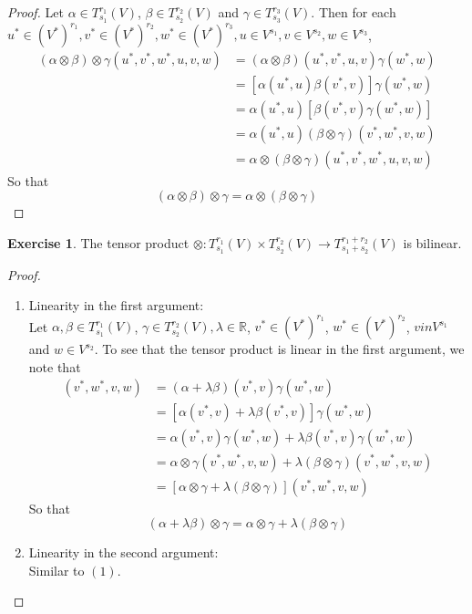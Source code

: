 \documentclass{book}
\theoremstyle{definition}
\newtheorem{ex}[definition]{Exercise}
\newcommand{\al}{\alpha}
\newcommand{\be}{\beta}
\newcommand{\gam}{\gamma}
\newcommand{\lam}{\lambda}
\newcommand{\R}{\mathbb{R}}
\DeclareMathOperator*{\0}{\mbf{0}}
\DeclareMathOperator*{\1}{\mbf{1}}
\newcommand{\Tn}[1]{T^{r_{#1}}_{s_{#1}}(V)}
\newcommand{\Tnp}{T^{r_1 + r_2}_{s_1 + s_2}(V)}
\begin{document}
	\begin{proof}
	Let $\al \in \Tn{1}$, $\be \in \Tn{2}$ and $\gam \in \Tn{3}$. Then for each $u^* \in (V^*)^{r_1}, v^* \in (V^*)^{r_2}, w^* \in (V^*)^{r_3}, u \in V^{s_1}, v \in V^{s_2}, w \in V^{s_3}$,  
	\begin{align*}
	(\al \otimes \be) \otimes \gam (u^*, v^*, w^*, u, v, w) 
	&= (\al \otimes \be) (u^*, v^*, u, v) \gam (w^*, w) \\
	&= [\al(u^*, u) \be(v^*, v)] \gam(w^*, w) \\
	&= \al(u^*, u) [\be(v^*, v) \gam(w^*, w)] \\
	&= \al(u^*, u) (\be \otimes \gam) (v^*, w^*, v, w) \\
	&= \al \otimes (\be \otimes \gam)(u^*, v^*, w^*, u, v, w) 
	\end{align*}
	So that $$(\al \otimes \be) \otimes \gam = \al \otimes (\be \otimes \gam)$$
\end{proof}		
	
	\begin{ex}
	The tensor product $\otimes : \Tn{1} \times  \Tn{2} \rightarrow \Tnp$ is bilinear. 
	\end{ex}
	
	\begin{proof}\
	\begin{enumerate}
	\item Linearity in the first argument:\\
	Let $\al, \be \in \Tn{1}$, $ \gam \in \Tn{2}, \lam \in \R$, $v^* \in (V^*)^{r_1}$, $w^* \in (V^*)^{r_2}$, $v in V^{s_1}$ and $w \in V^{s_2}$. To see that the tensor product is linear in the first argument, we note that  
	\begin{align*}
	[(\al + \lam \be) \otimes \gam] (v^*, w^*, v, w) 
	&= (\al + \lam \be)(v^*, v) \gam(w^*, w) \\
	&= [\al(v^*, v) + \lam \be (v^*, v)] \gam (w^*, w) \\
	&= \al(v^*, v) \gam (w^*, w) + \lam \be (v^*, v) \gam (w^*, w) \\
	&= \al \otimes \gam (v^*, w^*, v, w)  + \lam (\be \otimes \gam) (v^*, w^*, v, w) \\
	&= [\al \otimes \gam + \lam (\be \otimes \gam)] (v^*, w^*, v, w) 
	\end{align*}
	So that $$(\al + \lam \be) \otimes \gam = \al \otimes \gam + \lam (\be \otimes \gam)$$
	\item Linearity in the second argument:\\
	Similar to $(1)$.
	\end{enumerate}
\end{proof}			
	
\end{document}
